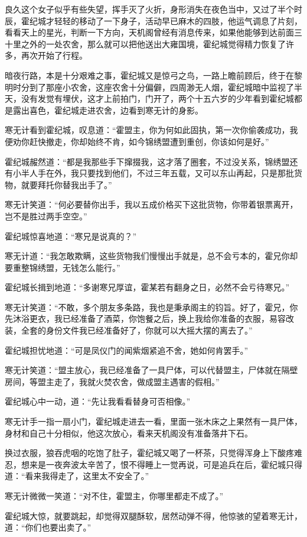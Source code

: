 良久这个女子似乎有些失望，挥手灭了火折，身形消失在夜色当中，又过了半个时辰，霍纪城才轻轻的移动了一下身子，活动早已麻木的四肢，他运气调息了片刻，看看天上的星光，判断一下方向，天机阁曾经有消息传来，如果他能够到达前面三十里之外的一处农舍，那么就可以把他送出大雍国境，霍纪城觉得精力恢复了许多，再次开始了行程。

暗夜行路，本是十分艰难之事，霍纪城又是惊弓之鸟，一路上瞻前顾后，终于在黎明时分到了那座小农舍，这座农舍十分偏僻，四周渺无人烟，霍纪城暗中监视了半天，没有发觉有埋伏，这才上前拍门，门开了，两个十五六岁的少年看到霍纪城都是露出喜色，霍纪城走进农舍，边看到寒无计的身影。

寒无计看到霍纪城，叹息道：“霍盟主，你为何如此固执，第一次你偷袭成功，我便劝你赶快撤走，你却始终不肯，如今锦绣盟遭到重创，你该如何是好。”

霍纪城赧然道：“都是我那些手下撺掇我，这才落了圈套，不过没关系，锦绣盟还有小半人手在外，我只要找到他们，不过三年五载，又可以东山再起，只是那批货物，就要拜托你替我出手了。”

寒无计笑道：“何必要替你出手，我以五成价格买下这批货物，你带着银票离开，岂不是胜过两手空空。”

霍纪城惊喜地道：“寒兄是说真的？”

寒无计道：“我怎敢欺瞒，这些货物我们慢慢出手就是，总不会亏本的，霍兄你却要重整锦绣盟，无钱怎么能行。”

霍纪城长揖到地道：“多谢寒兄厚谊，霍某若有翻身之日，必然不会亏待寒兄。”

寒无计笑道：“不敢，多个朋友多条路，我也是秉承阁主的钧旨。好了，霍兄，你先沐浴更衣，我已经准备了酒菜，你饱餐之后，换上我给你准备的衣服，易容改装，全套的身份文件我已经准备好了，你就可以大摇大摆的离去了。”

霍纪城担忧地道：“可是凤仪门的闻紫烟紧追不舍，她如何肯罢手。”

寒无计笑道：“盟主放心，我已经准备了一具尸体，可以代替盟主，尸体就在隔壁房间，等盟主走了，我就火焚农舍，做成盟主遇害的假相。”

霍纪城心中一动，道：“先让我看看替身可否相像。”

寒无计手一指一扇小门，霍纪城走进去一看，里面一张木床之上果然有一具尸体，身材和自己十分相似，他这次放心，看来天机阁没有准备落井下石。

换过衣服，狼吞虎咽的吃饱了肚子，霍纪城又喝了一杯茶，只觉得浑身上下酸疼难忍，想来是一夜奔波太辛苦了，恨不得睡上一觉再说，可是追兵在后，霍纪城只得道：“看来我得走了，这里太不安全了。”

寒无计微微一笑道：“对不住，霍盟主，你哪里都走不成了。”

霍纪城大惊，就要跳起，却觉得双腿酥软，居然动弹不得，他惊骇的望着寒无计，道：“你们也要出卖了。”

